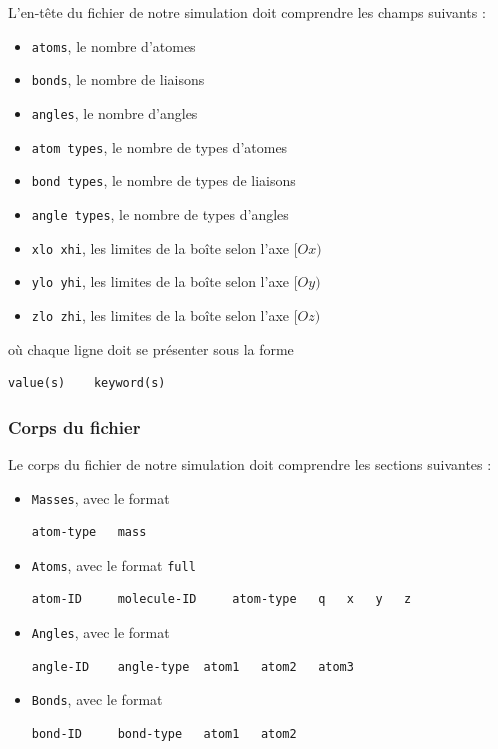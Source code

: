 \documentclass[11pt, a4paper]{article}
\begin{document}
L'en-tête du fichier de notre simulation doit comprendre les champs suivants :
\begin{itemize}
	\item \lstinline!atoms!, le nombre d'atomes
	\item \lstinline!bonds!, le nombre de liaisons
	\item \lstinline!angles!, le nombre d'angles
	\item \lstinline!atom types!, le nombre de types d'atomes
	\item \lstinline!bond types!, le nombre de types de liaisons
	\item \lstinline!angle types!, le nombre de types d'angles
	\item \lstinline!xlo xhi!, les limites de la boîte selon l'axe $[Ox)$
	\item \lstinline!ylo yhi!, les limites de la boîte selon l'axe $[Oy)$
	\item \lstinline!zlo zhi!, les limites de la boîte selon l'axe $[Oz)$
\end{itemize}
où chaque ligne doit se présenter sous la forme
\begin{lstlisting}
value(s)	keyword(s)
\end{lstlisting}

		\subsubsection{Corps du fichier}

Le corps du fichier de notre simulation doit comprendre les sections suivantes :
\begin{itemize}
	\item \lstinline!Masses!, avec le format
\begin{lstlisting}
atom-type	mass
\end{lstlisting}
	\item \lstinline!Atoms!, avec le format \lstinline!full!
\begin{lstlisting}
atom-ID 	molecule-ID 	atom-type	q	x	y	z
\end{lstlisting}
	\item \lstinline!Angles!, avec le format
\begin{lstlisting}
angle-ID	angle-type	atom1	atom2	atom3
\end{lstlisting}
	\item \lstinline!Bonds!, avec le format
\begin{lstlisting}
bond-ID 	bond-type	atom1	atom2
\end{lstlisting}
\end{itemize}
\end{document}
